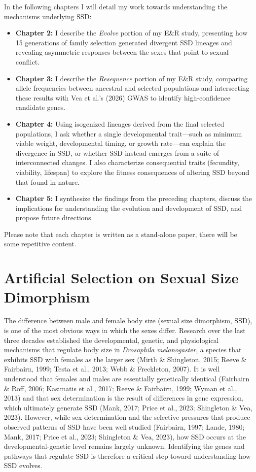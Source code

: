 \documentclass[12pt,reqno,oneside]{report}
\begin{document}
In the following chapters I will detail my work towards understanding the mechanisms underlying SSD: 

\begin{itemize}
\item \textbf{Chapter 2:} I describe the \textit{Evolve} portion of my E\&R study, presenting how 15 generations of family selection generated divergent SSD lineages and revealing asymmetric responses between the sexes that point to sexual conflict.
\item \textbf{Chapter 3:} I describe the \textit{Resequence} portion of my E\&R study, comparing allele frequencies between ancestral and selected populations and intersecting these results with Vea et al.'s (2026) GWAS to identify high-confidence candidate genes.
\item \textbf{Chapter 4:} Using isogenized lineages derived from the final selected populations, I ask whether a single developmental trait—such as minimum viable weight, developmental timing, or growth rate—can explain the divergence in SSD, or whether SSD instead emerges from a suite of interconnected changes. I also characterize consequential traits (fecundity, viability, lifespan) to explore the fitness consequences of altering SSD beyond that found in nature.
\item \textbf{Chapter 5:} I synthesize the findings from the preceding chapters, discuss the implications for understanding the evolution and development of SSD, and propose future directions.
\end{itemize}

Please note that each chapter is written as a stand-alone paper, there will be some repetitive content.

\newpage
\chapter{Artificial Selection on Sexual Size Dimorphism} 

The difference between male and female body size (sexual size dimorphism, SSD), is one of the most obvious ways in which the sexes differ. Research over the last three decades established the developmental, genetic, and physiological mechanisms that regulate body size in \textit{Drosophila melanogaster}, a species that exhibits SSD with females as the larger sex (Mirth \& Shingleton, 2015; Reeve \& Fairbairn, 1999; Testa et al., 2013; Webb \& Freckleton, 2007). It is well understood that females and males are essentially genetically identical (Fairbairn \& Roff, 2006; Kasimatis et al., 2017; Reeve \& Fairbairn, 1999; Wyman et al., 2013) and that sex determination is the result of differences in gene expression, which ultimately generate SSD (Mank, 2017; Price et al., 2023; Shingleton \& Vea, 2023). However, while sex determination and the selective pressures that produce observed patterns of SSD have been well studied (Fairbairn, 1997; Lande, 1980; Mank, 2017; Price et al., 2023; Shingleton \& Vea, 2023), how SSD occurs at the developmental-genetic level remains largely unknown. Identifying the genes and pathways that regulate SSD is therefore a critical step toward understanding how SSD evolves.
\end{document}
